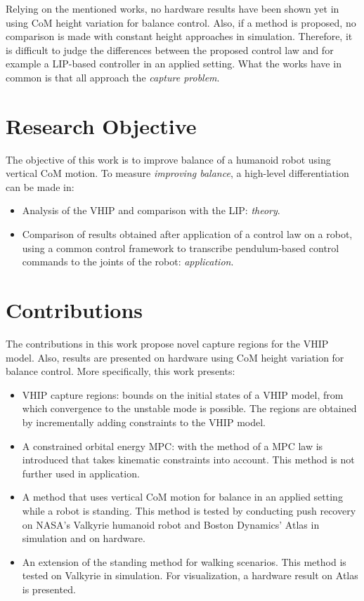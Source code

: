 Relying on the mentioned works, no hardware results have been shown yet in using \ac{CoM} height variation for balance control. Also, if a method is proposed, no comparison is made with constant height approaches in simulation. Therefore, it is difficult to judge the differences between the proposed control law and for example a \ac{LIP}-based controller in an applied setting. What the works have in common is that all approach the \textit{capture problem}.

\section{Research Objective}
The objective of this work is to improve balance of a humanoid robot using vertical \ac{CoM} motion. To measure \textit{improving balance}, a high-level differentiation can be made in:
\begin{itemize}
	\item Analysis of the \ac{VHIP} and comparison with the \ac{LIP}: \textit{theory}.
	\item Comparison of results obtained after application of a control law on a robot, using a common control framework to transcribe pendulum-based control commands to the joints of the robot: \textit{application}.
\end{itemize}

\section{Contributions}
The contributions in this work propose novel capture regions for the \ac{VHIP} model. Also, results are presented on hardware using \ac{CoM} height variation for balance control. More specifically, this work presents:
\begin{itemize}
	\item \ac{VHIP} capture regions: bounds on the initial states of a \ac{VHIP} model, from which convergence to the unstable mode is possible. The regions are obtained by incrementally adding constraints to the \ac{VHIP} model. 
      \item A constrained orbital energy \ac{MPC}: with the method of \cite{koolen2016balance} a \ac{MPC} law is introduced that takes kinematic constraints into account. This method is not further used in application.
	\item A method that uses vertical \ac{CoM} motion for balance in an applied setting while a robot is standing. This method is tested by conducting push recovery on NASA's Valkyrie humanoid robot and Boston Dynamics' Atlas in simulation and on hardware.
	\item An extension of the standing method for walking scenarios. This method is tested on Valkyrie in simulation. For visualization, a hardware result on Atlas is presented.
\end{itemize}
